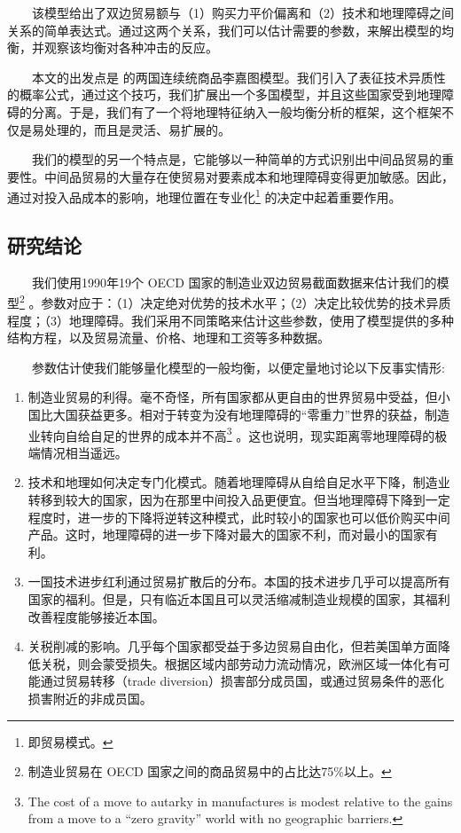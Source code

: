\documentclass[
]{article}
\begin{document}
　　该模型给出了双边贸易额与（1）购买力平价偏离和（2）技术和地理障碍之间关系的简单表达式。通过这两个关系，我们可以估计需要的参数，来解出模型的均衡，并观察该均衡对各种冲击的反应。

　　本文的出发点是 \citet{DFS1977} 的两国连续统商品李嘉图模型。我们引入了表征技术异质性的概率公式，通过这个技巧，我们扩展出一个多国模型，并且这些国家受到地理障碍的分离。于是，我们有了一个将地理特征纳入一般均衡分析的框架，这个框架不仅是易处理的，而且是灵活、易扩展的。

　　我们的模型的另一个特点是，它能够以一种简单的方式识别出中间品贸易的重要性。中间品贸易的大量存在使贸易对要素成本和地理障碍变得更加敏感。因此，通过对投入品成本的影响，地理位置在专业化\footnote{即贸易模式。} 的决定中起着重要作用。

\hypertarget{ux7814ux7a76ux7ed3ux8bba}{%
\subsection{研究结论}\label{ux7814ux7a76ux7ed3ux8bba}}

　　我们使用1990年19个 OECD 国家的制造业双边贸易截面数据来估计我们的模型\footnote{制造业贸易在 OECD 国家之间的商品贸易中的占比达75\%以上。} 。参数对应于：（1）决定绝对优势的技术水平；（2）决定比较优势的技术异质程度；（3）地理障碍。我们采用不同策略来估计这些参数，使用了模型提供的多种结构方程，以及贸易流量、价格、地理和工资等多种数据。

　　参数估计使我们能够量化模型的一般均衡，以便定量地讨论以下反事实情形:

\begin{enumerate}
\def\labelenumi{\arabic{enumi}.}
\item
  制造业贸易的利得。毫不奇怪，所有国家都从更自由的世界贸易中受益，但小国比大国获益更多。相对于转变为没有地理障碍的``零重力''世界的获益，制造业转向自给自足的世界的成本并不高\footnote{The cost of a move to autarky in manufactures is modest relative to the gains from a move to a ``zero gravity'' world with no geographic barriers.} 。这也说明，现实距离零地理障碍的极端情况相当遥远。
\item
  技术和地理如何决定专门化模式。随着地理障碍从自给自足水平下降，制造业转移到较大的国家，因为在那里中间投入品更便宜。但当地理障碍下降到一定程度时，进一步的下降将逆转这种模式，此时较小的国家也可以低价购买中间产品。这时，地理障碍的进一步下降对最大的国家不利，而对最小的国家有利。
\item
  一国技术进步红利通过贸易扩散后的分布。本国的技术进步几乎可以提高所有国家的福利。但是，只有临近本国且可以灵活缩减制造业规模的国家，其福利改善程度能够接近本国。
\item
  关税削减的影响。几乎每个国家都受益于多边贸易自由化，但若美国单方面降低关税，则会蒙受损失。根据区域内部劳动力流动情况，欧洲区域一体化有可能通过贸易转移（trade diversion）损害部分成员国，或通过贸易条件的恶化损害附近的非成员国。
\end{enumerate}
\end{document}

